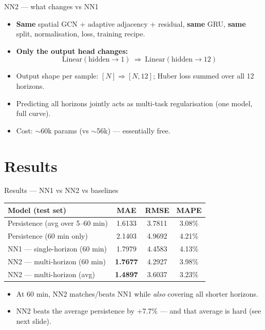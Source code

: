 \documentclass[aspectratio=169]{beamer}
\begin{document}
\begin{frame}{NN2 --- what changes vs NN1}
  \begin{itemize}
    \item \textbf{Same} spatial GCN + adaptive adjacency + residual, \textbf{same} GRU, \textbf{same} split, normalisation, loss, training recipe.
    \item \textbf{Only the output head changes:}
    \[ \mathrm{Linear}(\text{hidden}\to 1)\ \Longrightarrow\ \mathrm{Linear}(\text{hidden}\to 12) \]
    \item Output shape per sample: $[N] \Rightarrow [N, 12]$; Huber loss summed over all 12 horizons.
    \item Predicting all horizons jointly acts as multi-task regularisation (one model, full curve).
    \item Cost: $\sim$60k params (vs $\sim$56k) --- essentially free.
  \end{itemize}
\end{frame}

\section{Results}
\begin{frame}{Results --- NN1 vs NN2 vs baselines}
  \centering
  \begin{table}
  \begin{tabular}{lccc}
    \toprule
    Model (test set) & MAE & RMSE & MAPE \\
    \midrule
    Persistence (avg over 5--60 min) & 1.6133 & 3.7811 & 3.08\% \\
    Persistence (60 min only)        & 2.1403 & 4.9692 & 4.21\% \\
    \midrule
    NN1 --- single-horizon (60 min) & 1.7979 & 4.4583 & 4.13\% \\
    NN2 --- multi-horizon (60 min)  & \textbf{1.7677} & 4.2927 & 3.98\% \\
    NN2 --- multi-horizon (avg)     & \textbf{1.4897} & 3.6037 & 3.23\% \\
    \bottomrule
  \end{tabular}
  \end{table}
  \begin{itemize}
    \item At 60 min, NN2 matches/beats NN1 while \emph{also} covering all shorter horizons.
    \item NN2 beats the average persistence by +7.7\% --- and that average is hard (see next slide).
  \end{itemize}
\end{frame}
\end{document}
